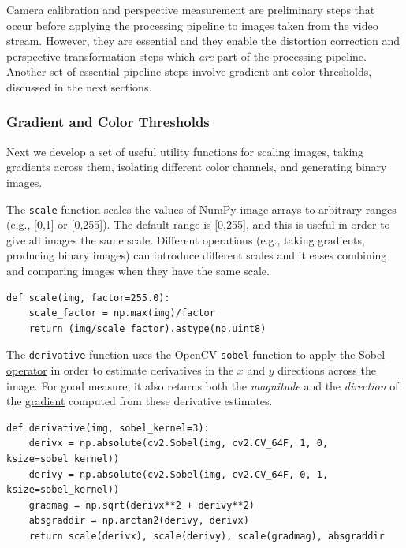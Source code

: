 \documentclass[11pt]{article}
\begin{document}
Camera calibration and perspective measurement are preliminary
steps that occur before applying the processing pipeline to
images taken from the video stream.  However, they are essential
and they enable the distortion correction and perspective
transformation steps which \emph{are} part of the processing
pipeline.  Another set of essential pipeline steps involve
gradient ant color thresholds, discussed in the next sections.  

\subsubsection*{Gradient and Color Thresholds}
\label{sec-1-2-4}

Next we develop a set of useful utility functions for scaling
images, taking gradients across them, isolating different color
channels, and generating binary images.

The \texttt{scale} function scales the values of NumPy image arrays to
arbitrary ranges (e.g., [0,1] or [0,255]).  The default range is
[0,255], and this is useful in order to give all images the same
scale.  Different operations (e.g., taking gradients, producing
binary images) can introduce different scales and it eases
combining and comparing images when they have the same scale.

\begin{verbatim}
def scale(img, factor=255.0):
    scale_factor = np.max(img)/factor
    return (img/scale_factor).astype(np.uint8)
\end{verbatim}

The \texttt{derivative} function uses the OpenCV \href{http://docs.opencv.org/2.4/modules/imgproc/doc/filtering.html#sobel}{\texttt{sobel}} function to
apply the \href{https://en.wikipedia.org/wiki/Sobel_operator}{Sobel operator} in order to estimate derivatives in the
$x$ and $y$ directions across the image.  For good measure, it
also returns both the \emph{magnitude} and the \emph{direction} of the
\href{https://en.wikipedia.org/wiki/Gradient}{gradient} computed from these derivative estimates.  

\begin{verbatim}
def derivative(img, sobel_kernel=3):
    derivx = np.absolute(cv2.Sobel(img, cv2.CV_64F, 1, 0, ksize=sobel_kernel))
    derivy = np.absolute(cv2.Sobel(img, cv2.CV_64F, 0, 1, ksize=sobel_kernel))
    gradmag = np.sqrt(derivx**2 + derivy**2)
    absgraddir = np.arctan2(derivy, derivx)
    return scale(derivx), scale(derivy), scale(gradmag), absgraddir
\end{verbatim}
\end{document}
